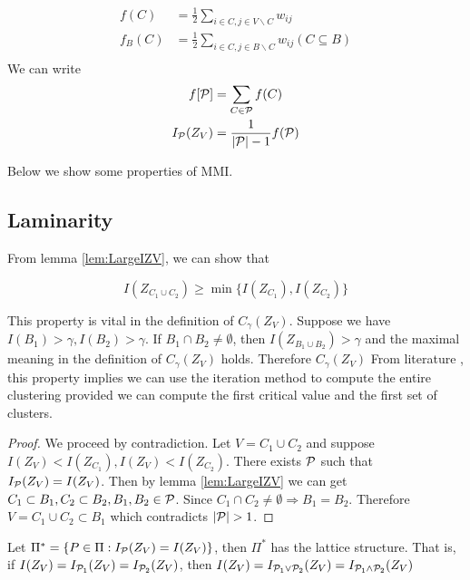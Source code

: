 \documentclass{article}
\newif\ifpublish
\begin{document}
\begin{align}
f(C) & = \frac{1}{2}\sum_{i\in C, j \in V\backslash C} w_{ij} \\
f_B(C) & = \frac{1}{2}\sum_{i\in C, j \in B\backslash C} w_{ij} (C \subseteq B) \\
\end{align}
We can write 
\begin{align}
f[\P] & = \sum_{C \in \P} f(C) \\
I_{\mathcal{P}}(Z_V)  &= \frac{1}{\abs{\P}  - 1}f(\P) 
\end{align}

Below we show some properties of MMI.
\ifpublish


\fi

\subsection{Laminarity}\label{sec:laminarity}
From lemma \ref{lem:LargeIZV}, we can show that
\begin{theorem}
\begin{equation}\label{eq:P}
I(Z_{C_1 \cup C_2}) \geq \min\{ I(Z_{C_1}), I(Z_{C_2})\}
\end{equation}
\end{theorem}
This property is vital in the definition of $C_{\gamma}(Z_V)$. Suppose we have
$I(B_1)>\gamma, I(B_2)>\gamma$. If $B_1 \cap B_2 \neq \emptyset$, then $I(Z_{B_1\cup B_2})>\gamma$ and the maximal meaning in the definition of $C_{\gamma}(Z_V)$ holds.
Therefore $C_{\gamma}(Z_V)$
From literature \cite{ic}, this property implies we can use the iteration method to compute the entire clustering
provided we can compute the first critical value and the first set of clusters.
\begin{proof}
	We proceed by contradiction. Let $V=C_1 \cup C_2$ and suppose $I(Z_V) < I(Z_{C_1}),
	I(Z_V) < I(Z_{C_2})$. There exists $\P$ such that $I_{\P}(Z_V) = I(Z_V)$.
	Then by lemma \ref{lem:LargeIZV} we can get $C_1 \subset B_1, C_2 \subset B_2, B_1, B_2 \in
	\P$. Since $C_1 \cap C_2 \neq \emptyset \Rightarrow B_1 = B_2$. Therefore $V=C_1 \cup C_2 \subset B_1$ which contradicts $\abs{\P}>1$.
\end{proof}

\begin{theorem}\label{thm:lattice}
Let $\Pi^* =  \{ P \in \Pi: I_{\P}(Z_V) = I(Z_V)\}$, then $\Pi^*$ has the lattice structure. That is, 
if $I(Z_V) = I_{\P_1}(Z_V) = I_{\P_2}(Z_V)$, then $I(Z_V) 
=  I_{\P_1 \vee \P_2}(Z_V) = 
 I_{\P_1 \wedge \P_2}(Z_V)$
\end{theorem}
\end{document}

